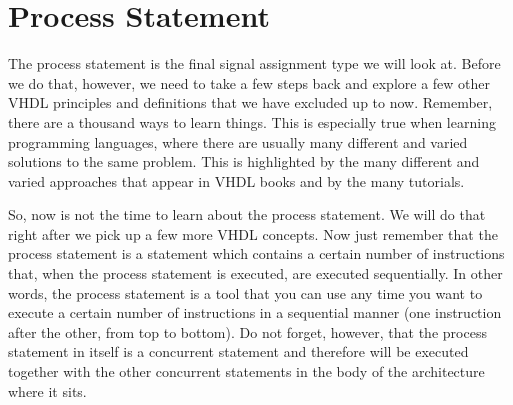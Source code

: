 \section{Process Statement}
The process statement is the final signal assignment type we will look at. Before we do that, however, we need to take a few steps back and explore a few other VHDL principles and definitions that we have excluded up to now. Remember, there are a thousand ways to learn things. This is especially true when learning programming languages, where there are usually many different and varied solutions to the same problem. This is highlighted by the many different and varied approaches that appear in VHDL books and by the many tutorials.

So, now is not the time to learn about the process statement. We will do that right after we pick up a few more VHDL concepts. Now just remember that the process statement is a statement which contains a certain number of instructions that, when the process statement is executed, are executed sequentially. In other words, the process statement is a tool that you can use any time you want to execute a certain number of instructions in a sequential manner (one instruction after the other, from top to bottom). Do not forget, however, that the process statement in itself is a concurrent statement and therefore will be executed together with the other concurrent statements in the body of the architecture where it sits.

